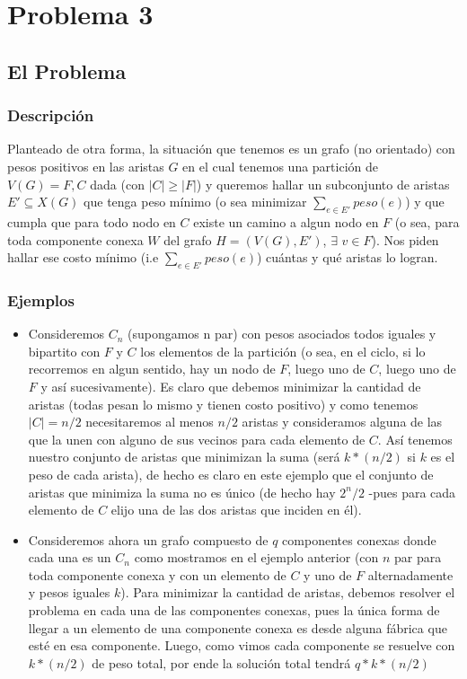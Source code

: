\documentclass[A4paper,oneside,fleqn,11pt]{article}
\theoremstyle{definition}
\begin{document}
\section{Problema 3}

\subsection{El Problema}

\subsubsection{Descripción}
Planteado de otra forma, la situación que tenemos es un grafo (no orientado) con pesos positivos en las aristas $G$ en el cual tenemos una partición de $V(G)={F,C}$ dada (con $|C| \geq |F|$) y queremos hallar un subconjunto de aristas $E' \subseteq X(G)$ que tenga peso mínimo (o sea minimizar $\sum\limits_{e \in E'} {peso(e)}$) y que cumpla que para todo nodo en $C$ existe un camino a algun nodo en $F$ (o sea, para toda componente conexa $W$ del grafo $H=(V(G),E')$, $\exists$ $v \in F$). Nos piden hallar ese costo mínimo (i.e $\sum\limits_{e \in E'} {peso(e)}$) cu\'antas y qué aristas lo logran.
\subsubsection{Ejemplos}

\begin{itemize}
\item Consideremos $C_{n}$ (supongamos n par) con pesos asociados todos iguales y bipartito con $F$ y $C$ los elementos de la partición (o sea, en el ciclo, si lo recorremos en algun sentido, hay un nodo de $F$, luego uno de $C$, luego uno de $F$ y así sucesivamente). Es claro que debemos minimizar la cantidad de aristas (todas pesan lo mismo y tienen costo positivo) y como tenemos $|C|=n/2$ necesitaremos al menos $n/2$ aristas y consideramos alguna de las que la unen con alguno de sus vecinos para cada elemento de $C$. Así tenemos nuestro conjunto de aristas que minimizan la suma (será $k*(n/2)$ si $k$ es el peso de cada arista), de hecho es claro en este ejemplo que el conjunto de aristas que minimiza la suma no es único (de hecho hay $2^n/2$ -pues para cada elemento de $C$ elijo una de las dos aristas que inciden en \'el).

\item Consideremos ahora un grafo compuesto de $q$ componentes conexas donde cada una es un $C_{n}$ como mostramos en el ejemplo anterior (con $n$ par para toda componente conexa y con un elemento de $C$ y uno de $F$ alternadamente y pesos iguales $k$). Para minimizar la cantidad de aristas, debemos resolver el problema en cada una de las componentes conexas, pues la única forma de llegar a un elemento de una componente conexa es desde alguna fábrica que est\'e en esa componente. Luego, como vimos cada componente se resuelve con $k*(n/2)$ de peso total, por ende la solución total tendr\'a $q*k*(n/2)$
\end{itemize}
\end{document}
